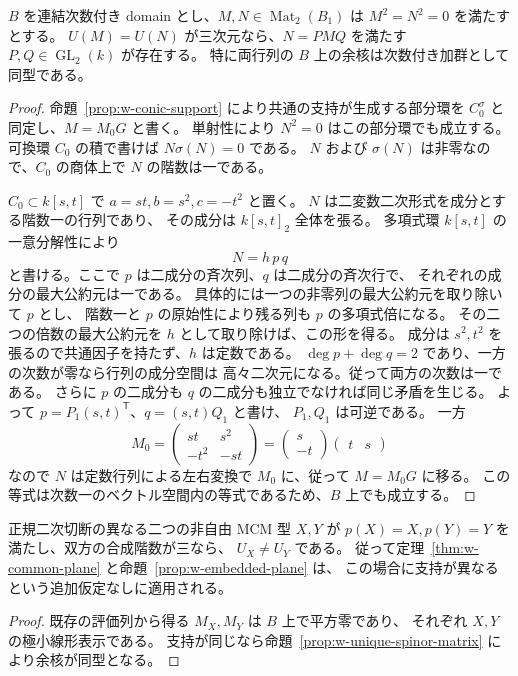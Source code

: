 \begin{proposition}[同じ支持を持つ平方零行列の一意性]
\label{prop:w-unique-spinor-matrix}
$B$ を連結次数付き domain とし、$M,N\in\operatorname{Mat}_2(B_1)$ は
$M^2=N^2=0$ を満たすとする。
$U(M)=U(N)$ が三次元なら、$N=PMQ$ を満たす $P,Q\in\operatorname{GL}_2(k)$ が存在する。
特に両行列の $B$ 上の余核は次数付き加群として同型である。
\end{proposition}
\begin{proof}
命題~\ref{prop:w-conic-support} により共通の支持が生成する部分環を
$C_0^\sigma$ と同定し、$M=M_0G$ と書く。
単射性により $N^2=0$ はこの部分環でも成立する。
可換環 $C_0$ の積で書けば $N\sigma(N)=0$ である。
$N$ および $\sigma(N)$ は非零なので、$C_0$ の商体上で $N$ の階数は一である。

$C_0\subset k[s,t]$ で $a=st,b=s^2,c=-t^2$ と置く。
$N$ は二変数二次形式を成分とする階数一の行列であり、
その成分は $k[s,t]_2$ 全体を張る。
多項式環 $k[s,t]$ の一意分解性により
\[
 N=h\,p\,q
\]
と書ける。ここで $p$ は二成分の斉次列、$q$ は二成分の斉次行で、
それぞれの成分の最大公約元は一である。
具体的には一つの非零列の最大公約元を取り除いて $p$ とし、
階数一と $p$ の原始性により残る列も $p$ の多項式倍になる。
その二つの倍数の最大公約元を $h$ として取り除けば、この形を得る。
成分は $s^2,t^2$ を張るので共通因子を持たず、$h$ は定数である。
$\deg p+\deg q=2$ であり、一方の次数が零なら行列の成分空間は
高々二次元になる。従って両方の次数は一である。
さらに $p$ の二成分も $q$ の二成分も独立でなければ同じ矛盾を生じる。
よって $p=P_1(s,t)^{\mathsf T}$、$q=(s,t)Q_1$ と書け、
$P_1,Q_1$ は可逆である。
一方
\[
 M_0=\begin{pmatrix}st&s^2\\-t^2&-st\end{pmatrix}
     =\begin{pmatrix}s\\-t\end{pmatrix}\begin{pmatrix}t&s\end{pmatrix}
\]
なので $N$ は定数行列による左右変換で $M_0$ に、従って $M=M_0G$ に移る。
この等式は次数一のベクトル空間内の等式であるため、$B$ 上でも成立する。
\end{proof}

\begin{corollary}
\label{cor:w-distinct-supports}
正規二次切断の異なる二つの非自由 MCM 型 $X,Y$ が
$p(X)=X,p(Y)=Y$ を満たし、双方の合成階数が三なら、
$U_X\ne U_Y$ である。
従って定理~\ref{thm:w-common-plane} と命題~\ref{prop:w-embedded-plane} は、
この場合に支持が異なるという追加仮定なしに適用される。
\end{corollary}
\begin{proof}
既存の評価列から得る $M_X,M_Y$ は $B$ 上で平方零であり、
それぞれ $X,Y$ の極小線形表示である。
支持が同じなら命題~\ref{prop:w-unique-spinor-matrix} により余核が同型となる。
\end{proof}

